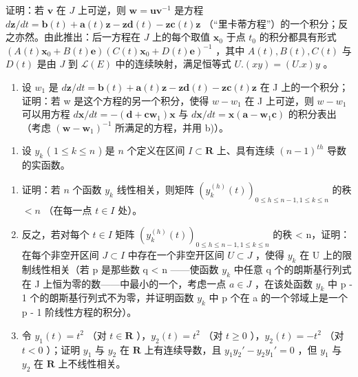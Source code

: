 证明：若 \(\mathbf{v}\) 在 \(J\) 上可逆，则 \(\mathbf{w} = \mathbf{u}\mathbf{v}^{-1}\) 是方程 \(d\mathbf{z}/dt = \mathbf{b}(t) + \mathbf{a}(t)\mathbf{z} - \mathbf{z}\mathbf{d}(t) - \mathbf{z}\mathbf{c}(t)\mathbf{z}\) （“里卡蒂方程”）的一个积分；反之亦然。由此推出：后一方程在 \(J\) 上的每个取值 \(\mathbf{x}_0\) 于点 \(t_0\) 的积分都具有形式 \((A(t)\mathbf{x}_0 + B(t)\mathbf{e})(C(t)\mathbf{x}_0 + D(t)\mathbf{e})^{-1}\) ，其中 \(A(t), B(t), C(t)\) 与 \(D(t)\) 是由 \(J\) 到 \(\mathcal{L}(E)\) 中的连续映射，满足恒等式 \(U.(xy) = (U.x)y\) 。

\begin{enumerate}
\def\labelenumi{\alph{enumi})}
\setcounter{enumi}{3}
\tightlist
\item
  设 \(w_{1}\) 是 \(d\mathbf{z}/dt = \mathbf{b}(t) + \mathbf{a}(t)\mathbf{z} - \mathbf{z}\mathbf{d}(t) - \mathbf{z}\mathbf{c}(t)\mathbf{z}\) 在 J 上的一个积分；证明：若 w 是这个方程的另一个积分，使得 \(w - w_{1}\) 在 J 上可逆，则 \(w - w_{1}\) 可以用方程 \(d\mathbf{x}/dt = -(\mathbf{d} + \mathbf{c}\mathbf{w}_{1})\mathbf{x}\) 与 \(d\mathbf{x}/dt = \mathbf{x}(\mathbf{a} - \mathbf{w}_{1}\mathbf{c})\) 的积分表出（考虑 \((\mathbf{w} - \mathbf{w}_{1})^{-1}\) 所满足的方程，并用 b)）。
\end{enumerate}

\begin{enumerate}
\def\labelenumi{\arabic{enumi})}
\setcounter{enumi}{8}
\tightlist
\item
  设 \(y_{k}\) ( \(1 \leqslant k \leqslant n\) ) 是 \(n\) 个定义在区间 \(I \subset \mathbf{R}\) 上、具有连续 \((n - 1)^{th}\) 导数的实函数。
\end{enumerate}

\begin{enumerate}
\def\labelenumi{\alph{enumi})}
\item
  证明：若 \(n\) 个函数 \(y_{k}\) 线性相关，则矩阵 \((y_{k}^{(h)}(t))_{0\leqslant h\leqslant n - 1, 1\leqslant k\leqslant n}\) 的秩 \(< n\) （在每一点 \(t\in I\) 处）。
\item
  反之，若对每个 \(t \in I\) 矩阵 \((y_{k}^{(h)}(t))_{0 \leqslant h \leqslant n-1, 1 \leqslant k \leqslant n}\) 的秩 \textless{} n，证明：在每个非空开区间 \(J \subset I\) 中存在一个非空开区间 \(U \subset J\) ，使得 \(y_{k}\) 在 U 上的限制线性相关（若 p 是那些数 q \textless{} n ——使函数 \(y_{k}\) 中任意 q 个的朗斯基行列式在 J 上恒为零的数——中最小的一个，考虑一点 \(a \in J\) ，在该处函数 \(y_{k}\) 中 p - 1 个的朗斯基行列式不为零，并证明函数 \(y_{k}\) 中 p 个在 a 的一个邻域上是一个 p - 1 阶线性方程的积分）。
\item
  令 \(y_{1}(t) = t^{2}\) （对 \(t \in \mathbf{R}\) ），\(y_{2}(t) = t^{2}\) （对 \(t \geqslant 0\) ），\(y_{2}(t) = -t^{2}\) （对 \(t < 0\) ）；证明 \(y_{1}\) 与 \(y_{2}\) 在 \(\mathbf{R}\) 上有连续导数，且 \(y_{1}y_{2}' - y_{2}y_{1}' = 0\) ，但 \(y_{1}\) 与 \(y_{2}\) 在 \(\mathbf{R}\) 上不线性相关。
\end{enumerate}

